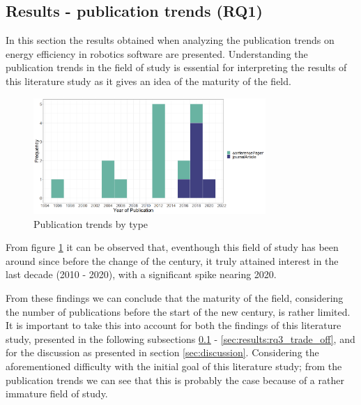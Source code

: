 \subsection{Results - publication trends (RQ1)}
\label{sec:results:rq1_pub_trends}

In this section the results obtained when analyzing the publication trends on energy efficiency in robotics software are presented.
Understanding the publication trends in the field of study is essential for interpreting the results of this literature study as it gives
an idea of the maturity of the field.

\begin{figure}
    \includegraphics[width=250pt]{figures/publication_trend_extended.png}
    \caption{Publication trends by type}
    \label{fig:pub_trends}
\end{figure}

From figure \ref{fig:pub_trends} it can be observed that, eventhough this field of study has been around since before the change of the century,
it truly attained interest in the last decade (2010 - 2020), with a significant spike nearing 2020.

From these findings we can conclude that the maturity of the field, considering the number of publications before the start of the new century, 
is rather limited. It is important to take this into account for both the findings of this literature study, presented in the following subsections 
\ref{sec:results:rq1_pub_trends} - \ref{sec:results:rq3_trade_off}, and for the discussion as presented in section \ref{sec:discussion}.
Considering the aforementioned difficulty with the initial goal of this literature study; from the publication trends we can see that this 
is probably the case because of a rather immature field of study.



